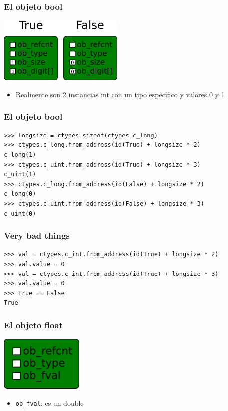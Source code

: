 \documentclass[10pt]{beamer}
\begin{document}
  \begin{frame}[containsverbatim]
    \frametitle{El objeto bool}
    \begin{center}\includegraphics[width=6cm]{img/True-False.png}\end{center}
    \begin{itemize}
      \item Realmente son 2 instancias int con un tipo específico y valores 0 y 1
    \end{itemize}
  \end{frame}

  \begin{frame}[containsverbatim]
    \frametitle{El objeto bool}
    \begin{verbatim}
>>> longsize = ctypes.sizeof(ctypes.c_long)
>>> ctypes.c_long.from_address(id(True) + longsize * 2)
c_long(1)
>>> ctypes.c_uint.from_address(id(True) + longsize * 3)
c_uint(1)
>>> ctypes.c_long.from_address(id(False) + longsize * 2)
c_long(0)
>>> ctypes.c_uint.from_address(id(False) + longsize * 3)
c_uint(0)
    \end{verbatim}
  \end{frame}

  \begin{frame}[containsverbatim]
    \frametitle{Very bad things}
    \begin{verbatim}
>>> val = ctypes.c_int.from_address(id(True) + longsize * 2)
>>> val.value = 0
>>> val = ctypes.c_int.from_address(id(True) + longsize * 3)
>>> val.value = 0
>>> True == False
True
    \end{verbatim}
  \end{frame}

  \begin{frame}[containsverbatim]
    \frametitle{El objeto float}
    \begin{center}\includegraphics[width=4cm]{img/Float.png}\end{center}
    \begin{itemize}
      \item \verb+ob_fval+: es un double
    \end{itemize}
  \end{frame}
\end{document}
